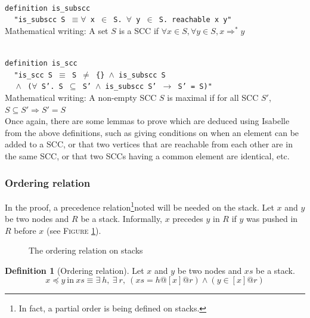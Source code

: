 \documentclass[a4 paper, 12pt]{article}
\newcommand{\where}{{\color{isa_green}{where}}}
\newcommand{\isa}[1]{\small\texttt{\\\noindent#1}}
\newcommand{\blue}[1]{{\color{isa_dark_blue}{#1}}}
\theoremstyle{definition}
\newtheorem{definition}{Definition}
\begin{document}
\isa{
{\color{isa_blue}definition} is\_subscc \where\\
$~~~~~$"is\_subscc S $\equiv \forall$ x $\in$ S. $\forall$ y $\in$ S. reachable x y"\\
}
Mathematical writing: A set $S$ is a SCC if $\forall x \in S, \forall y \in S, x \Rightarrow^* y$

\isa{
{\color{isa_blue}definition} is\_scc \where\\
$~~~~~$"is\_scc S $\equiv$ S $\neq$ \{\} $\wedge$ is\_subscc S\\
$~~~~~\wedge$ ($\forall$ S'. S $\subseteq$ S' $\wedge$ is\_subscc S' $\longrightarrow$ S' = S)"\\
}
Mathematical writing: A non-empty SCC $S$ is maximal if for all SCC $S'$, $S \subseteq S' \Longrightarrow S'=S$\\

Once again, there are some lemmas to prove which are deduced using Isabelle from the above definitions, such as giving conditions on when an element can be added to a SCC, or that two vertices that are reachable from each other are in the same SCC, or that two SCCs having a common element are identical, etc.

\subsubsection{Ordering relation}\label{sec:orderingrelation}
In the proof, a precedence relation\footnote{In fact, a partial order is being defined on stacks.}noted \blue{$\bullet~\preceq~\bullet~\text{in}~\bullet$} will be needed on the stack. Let $x$ and $y$ be two nodes and $R$ be a stack. Informally, $x$ precedes $y$ in $R$ if $y$ was pushed in $R$ before $x$ (see \textsc{Figure} \ref{fig:stackorder}).

\begin{figure}[!h]
    \caption{The ordering relation on stacks\label{fig:stackorder}}
\end{figure}

\begin{definition}[Ordering relation]
    Let $x$ and $y$ be two nodes and $xs$ be a stack.
    \begin{equation*}
        x \preceq y~\text{in}~xs \equiv \exists~h,~\exists~r,~(xs = h @ [x] @ r) \wedge (y \in [x]@r)
    \end{equation*}
\end{definition}
\end{document}
